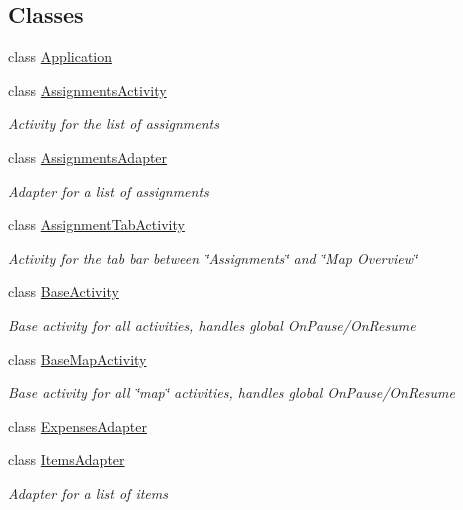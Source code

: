 \subsection*{Classes}
\begin{DoxyCompactItemize}
\item 
class \hyperlink{class_field_service_1_1_android_1_1_application}{Application}
\item 
class \hyperlink{class_field_service_1_1_android_1_1_assignments_activity}{Assignments\+Activity}
\begin{DoxyCompactList}\small\item\em Activity for the list of assignments \end{DoxyCompactList}\item 
class \hyperlink{class_field_service_1_1_android_1_1_assignments_adapter}{Assignments\+Adapter}
\begin{DoxyCompactList}\small\item\em Adapter for a list of assignments \end{DoxyCompactList}\item 
class \hyperlink{class_field_service_1_1_android_1_1_assignment_tab_activity}{Assignment\+Tab\+Activity}
\begin{DoxyCompactList}\small\item\em Activity for the tab bar between \char`\"{}\+Assignments\char`\"{} and \char`\"{}\+Map Overview\char`\"{} \end{DoxyCompactList}\item 
class \hyperlink{class_field_service_1_1_android_1_1_base_activity}{Base\+Activity}
\begin{DoxyCompactList}\small\item\em Base activity for all activities, handles global On\+Pause/\+On\+Resume \end{DoxyCompactList}\item 
class \hyperlink{class_field_service_1_1_android_1_1_base_map_activity}{Base\+Map\+Activity}
\begin{DoxyCompactList}\small\item\em Base activity for all \char`\"{}map\char`\"{} activities, handles global On\+Pause/\+On\+Resume \end{DoxyCompactList}\item 
class \hyperlink{class_field_service_1_1_android_1_1_expenses_adapter}{Expenses\+Adapter}
\item 
class \hyperlink{class_field_service_1_1_android_1_1_items_adapter}{Items\+Adapter}
\begin{DoxyCompactList}\small\item\em Adapter for a list of items \end{DoxyCompactList}\item 

\end{DoxyCompactItemize}
